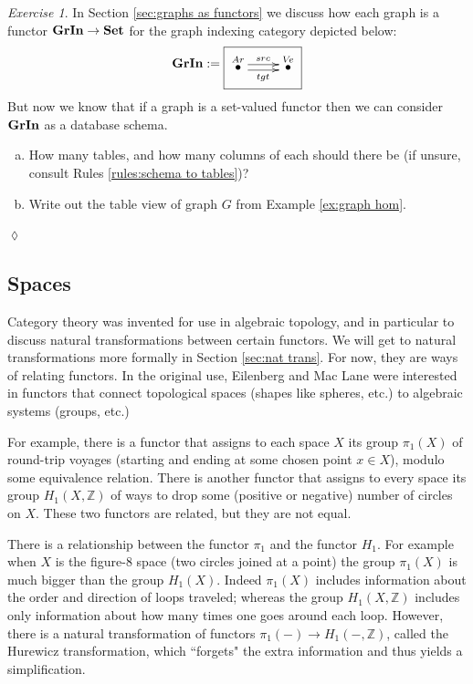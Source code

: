 \documentclass{book}
\makeatletter
\def\ZZ{{\mathbb Z}}
\def\to{\rightarrow}
\newcommand{\LMO}[1]{\stackrel{#1}{\bullet}}
\def\Set{{\bf Set}}
\theoremstyle{remark}
\newtheorem{exc}[subsubsection]{Exercise}
\newenvironment{exercise}{\begin{exc}}{\hspace*{\fill}$\lozenge$\end{exc}}
\theoremstyle{definition}
\def\GrIn{{\bf GrIn}}
\def\GrInSchema{\xymatrix{\LMO{Ar}\ar@<.5ex>[r]^{src}\ar@<-.5ex>[r]_{tgt}&\LMO{V\!e}}}
\def\sexc{\begin{enumerate}[a.)]\setlength{\itemsep}{.1cm}\setlength{\parskip}{.1cm}\item}
\def\next{\item}
\def\endsexc{\end{enumerate}}
\makeatother
\begin{document}
\begin{exercise}
In Section \ref{sec:graphs as functors} we discuss how each graph is a functor $\GrIn\to\Set$ for the graph indexing category depicted below:
$$\GrIn:=\fbox{\GrInSchema}$$
But now we know that if a graph is a set-valued functor then we can consider $\GrIn$ as a database schema.
\sexc How many tables, and how many columns of each should there be (if unsure, consult Rules \ref{rules:schema to tables})?
\next Write out the table view of graph $G$ from Example \ref{ex:graph hom}. 
\endsexc
\end{exercise}


\subsection{Spaces}

Category theory was invented for use in algebraic topology, and in particular to discuss natural transformations between certain functors. We will get to natural transformations more formally in Section \ref{sec:nat trans}. For now, they are ways of relating functors. In the original use, Eilenberg and Mac Lane were interested in functors that connect topological spaces (shapes like spheres, etc.) to algebraic systems (groups, etc.) 

For example, there is a functor that assigns to each space $X$ its group $\pi_1(X)$ of round-trip voyages (starting and ending at some chosen point $x\in X$), modulo some equivalence relation. There is another functor that assigns to every space its group $H_1(X,\ZZ)$ of ways to drop some (positive or negative) number of circles on $X$. These two functors are related, but they are not equal. 

There is a relationship between the functor $\pi_1$ and the functor $H_1$. For example when $X$ is the figure-$8$ space (two circles joined at a point) the group $\pi_1(X)$ is much bigger than the group $H_1(X)$. Indeed $\pi_1(X)$ includes information about the order and direction of loops traveled; whereas the group $H_1(X,\ZZ)$ includes only information about how many times one goes around each loop. However, there is a natural transformation of functors $\pi_1(-)\to H_1(-,\ZZ)$, called the Hurewicz transformation, which ``forgets" the extra information and thus yields a simplification. 
\end{document}
